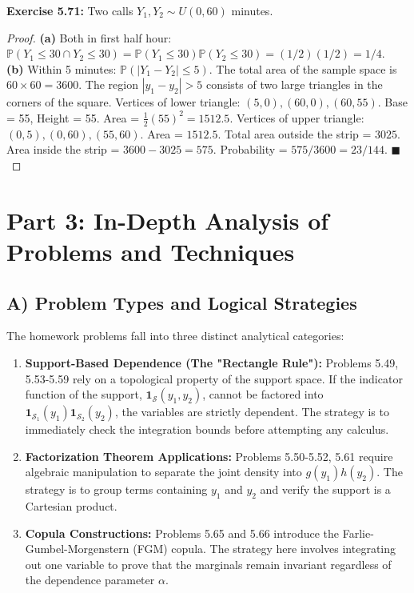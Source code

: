 \documentclass[11pt, a4paper]{article}
\theoremstyle{definition}
\theoremstyle{remark}
\newcommand{\Prob}{\mathbb{P}}
\begin{document}
\textbf{Exercise 5.71:} Two calls $Y_1, Y_2 \sim U(0, 60)$ minutes.
\begin{proof}
\textbf{(a)} Both in first half hour: $\Prob(Y_1 \le 30 \cap Y_2 \le 30) = \Prob(Y_1 \le 30)\Prob(Y_2 \le 30) = (1/2)(1/2) = 1/4$. \\
\textbf{(b)} Within 5 minutes: $\Prob(|Y_1 - Y_2| \le 5)$.
The total area of the sample space is $60 \times 60 = 3600$.
The region $|y_1 - y_2| > 5$ consists of two large triangles in the corners of the square.
Vertices of lower triangle: $(5,0), (60,0), (60, 55)$. Base = 55, Height = 55. Area = $\frac{1}{2}(55)^2 = 1512.5$.
Vertices of upper triangle: $(0,5), (0,60), (55, 60)$. Area = $1512.5$.
Total area outside the strip = $3025$.
Area inside the strip = $3600 - 3025 = 575$.
Probability = $575 / 3600 = 23/144$. $\blacksquare$
\end{proof}

\newpage
\section{Part 3: In-Depth Analysis of Problems and Techniques}

\subsection{A) Problem Types and Logical Strategies}
The homework problems fall into three distinct analytical categories:
\begin{enumerate}
    \item \textbf{Support-Based Dependence (The "Rectangle Rule"):} Problems 5.49, 5.53-5.59 rely on a topological property of the support space. If the indicator function of the support, $\mathbf{1}_{\mathcal{S}}(y_1, y_2)$, cannot be factored into $\mathbf{1}_{\mathcal{S}_1}(y_1)\mathbf{1}_{\mathcal{S}_2}(y_2)$, the variables are strictly dependent. The strategy is to immediately check the integration bounds before attempting any calculus.
    \item \textbf{Factorization Theorem Applications:} Problems 5.50-5.52, 5.61 require algebraic manipulation to separate the joint density into $g(y_1)h(y_2)$. The strategy is to group terms containing $y_1$ and $y_2$ and verify the support is a Cartesian product.
    \item \textbf{Copula Constructions:} Problems 5.65 and 5.66 introduce the Farlie-Gumbel-Morgenstern (FGM) copula. The strategy here involves integrating out one variable to prove that the marginals remain invariant regardless of the dependence parameter $\alpha$.
\end{enumerate}
\end{document}
